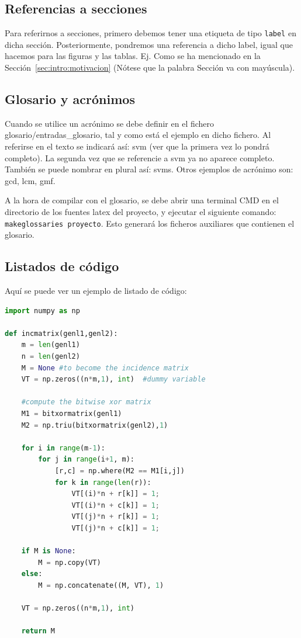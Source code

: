 \subsection*{Referencias a secciones}

Para referirnos a secciones, primero debemos tener una etiqueta de tipo \texttt{label} en dicha sección. Posteriormente, pondremos una referencia a dicho label, igual que hacemos para las figuras y las tablas. Ej. Como se ha mencionado en la Sección~\ref{sec:intro:motivacion} (Nótese que la palabra Sección va con mayúscula).

\subsection*{Glosario y acrónimos}

Cuando se utilice un acrónimo se debe definir en el fichero glosario/entradas\_glosario, tal y como está el ejemplo en dicho fichero. Al referirse en el texto se indicará así: \gls{svm} (ver que la primera vez lo pondrá completo). La segunda vez que se referencie a \gls{svm} ya no aparece completo. También se puede nombrar en plural así: \glspl{svm}. 
Otros ejemplos de acrónimo son: \gls{gcd}, \gls{lcm}, \gls{gmf}. 

A la hora de compilar con el glosario, se debe abrir una terminal CMD en el directorio de los fuentes latex del proyecto, y ejecutar el siguiente comando: \texttt{makeglossaries proyecto}. Esto generará los ficheros auxiliares que contienen el glosario. 

\subsection*{Listados de código}

Aquí se puede ver un ejemplo de listado de código: 



\begin{lstlisting}[language=Python,caption=Ejemplo de Python, label=listado:pythonPrueba]
import numpy as np

def incmatrix(genl1,genl2):
	m = len(genl1)
	n = len(genl2)
	M = None #to become the incidence matrix
	VT = np.zeros((n*m,1), int)  #dummy variable

	#compute the bitwise xor matrix
	M1 = bitxormatrix(genl1)
	M2 = np.triu(bitxormatrix(genl2),1) 
	
	for i in range(m-1):
		for j in range(i+1, m):
			[r,c] = np.where(M2 == M1[i,j])
			for k in range(len(r)):
				VT[(i)*n + r[k]] = 1;
				VT[(i)*n + c[k]] = 1;
				VT[(j)*n + r[k]] = 1;
				VT[(j)*n + c[k]] = 1;
	
	if M is None:
		M = np.copy(VT)
	else:
		M = np.concatenate((M, VT), 1)
	
	VT = np.zeros((n*m,1), int)
	
	return M

\end{lstlisting}

